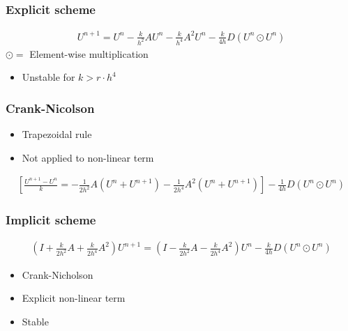 \documentclass[screen]{beamer}
\begin{document}
\begin{frame}
\frametitle{Explicit scheme}
\flushright

\begin{align*}
U^{n+1} = U^n - \frac{k}{h^2}AU^n - \frac{k}{h^4}A^2U^n - \frac{k}{4h}D(U^{n}\odot U^n)
\end{align*}
$\odot =$ Element-wise multiplication
\begin{itemize}
\item Unstable for $k > r \cdot h^4$

\end{itemize}
\end{frame}


\begin{frame}
\frametitle{Crank-Nicolson}
\begin{itemize}
\normalsize
\item Trapezoidal rule
\item Not applied to non-linear term
\end{itemize}
\small
\begin{align*}
 \left[\frac{U^{n+1} - U^n}{k} =
- \frac{1}{2h^2}A(U^n+U^{n+1}) - \frac{1}{2h^4}A^2(U^n + U^{n+1}) \right] - \frac{1}{4h}D(U^{n}\odot U^n)
\end{align*}

\end{frame}


\begin{frame}
\frametitle{Implicit scheme}
\begin{align*}
(I + \frac{k}{2h^2}A + \frac{k}{2h^4}A^2)U^{n+1}
= (I - \frac{k}{2h^2}A - \frac{k}{2h^4}A^2)U^n - \frac{k}{4h}D(U^{n}\odot U^n)
\end{align*}

\begin{itemize}
\item Crank-Nicholson
\item Explicit non-linear term
\item Stable
\end{itemize}

\end{frame}
\end{document}
